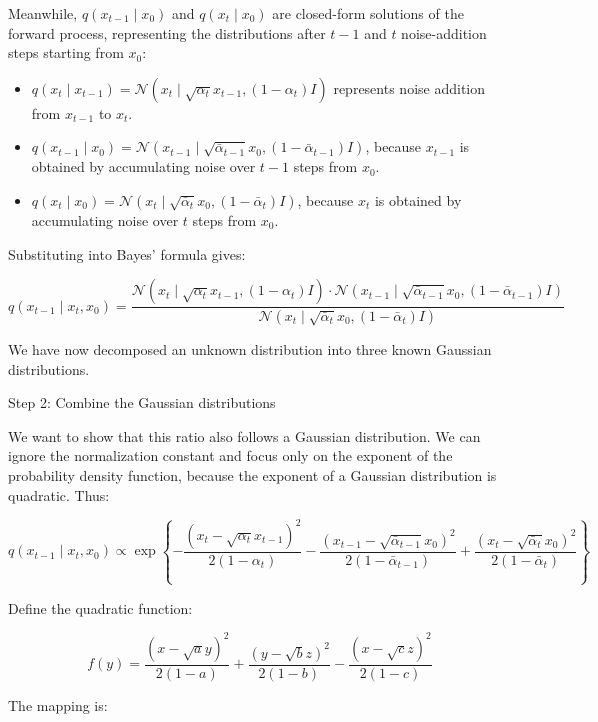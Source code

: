 Meanwhile, \(q(x_{t-1}\mid x_0)\) and \(q(x_t\mid x_0)\) are closed-form solutions of the forward process, representing the distributions after \(t-1\) and \(t\) noise-addition steps starting from \(x_0\):

\begin{itemize}
\tightlist
\item
  \(q(x_t\mid x_{t-1})=\mathcal{N}(x_t\mid\sqrt{\alpha_t}x_{t-1},(1-\alpha_t)I)\) represents noise addition from \(x_{t-1}\) to \(x_t\).
\item
  \(q(x_{t-1}\mid x_0)=\mathcal{N}(x_{t-1}\mid\sqrt{\bar{\alpha}_{t-1}}x_0,(1-\bar{\alpha}_{t-1})I)\), because \(x_{t-1}\) is obtained by accumulating noise over \(t-1\) steps from \(x_0\).
\item
  \(q(x_t\mid x_0)=\mathcal{N}(x_t\mid\sqrt{\bar{\alpha}_t}x_0,(1-\bar{\alpha}_t)I)\), because \(x_t\) is obtained by accumulating noise over \(t\) steps from \(x_0\).
\end{itemize}

Substituting into Bayes' formula gives:

\[
q(x_{t-1}\mid x_t,x_0)
= \frac{
\mathcal{N}(x_t\mid\sqrt{\alpha_t}x_{t-1},(1-\alpha_t)I)\cdot
\mathcal{N}(x_{t-1}\mid\sqrt{\bar{\alpha}_{t-1}}x_0,(1-\bar{\alpha}_{t-1})I)
}{
\mathcal{N}(x_t\mid\sqrt{\bar{\alpha}_t}x_0,(1-\bar{\alpha}_t)I)
}
\]

We have now decomposed an unknown distribution into three known Gaussian distributions.

Step 2: Combine the Gaussian distributions

We want to show that this ratio also follows a Gaussian distribution. We can ignore the normalization constant and focus only on the exponent of the probability density function, because the exponent of a Gaussian distribution is quadratic. Thus:

\[
q(x_{t-1}\mid x_t,x_0)
\propto
\exp\left\{
-\frac{(x_t-\sqrt{\alpha_t}x_{t-1})^2}{2(1-\alpha_t)}
-\frac{(x_{t-1}-\sqrt{\bar{\alpha}_{t-1}}x_0)^2}{2(1-\bar{\alpha}_{t-1})}
+\frac{(x_t-\sqrt{\bar{\alpha}_t}x_0)^2}{2(1-\bar{\alpha}_t)}
\right\}
\]

Define the quadratic function:

\[
f(y)=
\frac{(x-\sqrt{a}y)^2}{2(1-a)}
+\frac{(y-\sqrt{b}z)^2}{2(1-b)}
-\frac{(x-\sqrt{c}z)^2}{2(1-c)}
\]

The mapping is:

